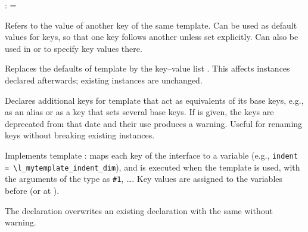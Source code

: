\documentclass{l3in2edoc}
\begin{document}
\begin{function}[user]
  {
    \KeyValue
  }
  \begin{syntax}
     :  =  
  \end{syntax}
  Refers to the value of another key of the same template. Can be
  used as default values for keys, so that one key follows another
  unless set explicitly. Can also be used in  or
   to specify key values there.
\end{function}


\begin{function}[]
  {
    \EditTemplateDefaults
  }
  \begin{syntax}
       
  \end{syntax}
  Replaces the defaults of template  by the key--value list
  . This affects instances declared afterwards;
  existing instances are unchanged.
\end{function}



\begin{function}[]
  {
    \DeclareTemplateInterfaceEquivalents
  }
  \begin{syntax}
        
  \end{syntax}
  Declares additional keys for template  that act as
  equivalents of its base keys, e.g., as an alias or as a key that sets
  several base keys. If  is given, the keys are
  deprecated from that date and their use produces a warning. Useful
  for renaming keys without breaking existing instances.
\end{function}


\begin{function}[]
  {
    \DeclareTemplateCode
  }
  \begin{syntax}
         
  \end{syntax}
  Implements template :  maps each key
  of the interface to a variable (e.g.,
  \texttt{indent = \textbackslash l\_mytemplate\_indent\_dim}), and
   is executed when the template is used, with the
  arguments of the type as \texttt{\#1}, \ldots. Key values are
  assigned to the variables before  (or at
  ).

  The declaration overwrites an existing declaration with the same
   without warning.
\end{function}
\end{document}
